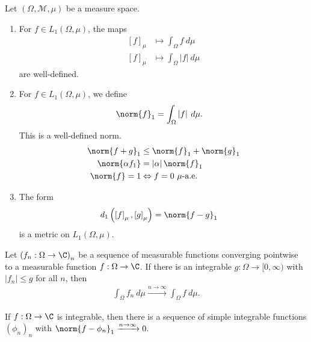 \begin{fact}
  Let $\left(\Omega,\mathcal{M},\mu\right)$ be a measure space.
  \begin{enumerate}[(1)]
    \item For $f\in L_{1}\left(\Omega,\mu\right)$, the maps
      \begin{align*}
        \left[f\right]_{\mu} &\longmapsto \int_{\Omega}^{} f\:d\mu\\
        \left[f\right]_{\mu} &\longmapsto \int_{\Omega}^{} \left\vert f \right\vert\:d\mu
      \end{align*}
      are well-defined.
    \item For $f\in L_{1}\left(\Omega,\mu\right)$, we define
      \begin{align*}
        \norm{f}_{1} &= \int_{\Omega}^{} \left\vert f \right\vert\:d\mu.
      \end{align*}
      This is a well-defined norm.
      \begin{align*}
        \norm{f+g}_{1} &\leq \norm{f}_{1} + \norm{g}_{1}\\
        \norm{\alpha f_1} &= \left\vert \alpha \right\vert\norm{f}_{1}\\
        \norm{f} = 1 &\Leftrightarrow f= 0 \text{ $\mu$-a.e.}
      \end{align*}
    \item The form
      \begin{align*}
        d_1\left(\left[f\right]_{\mu},\left[g\right]_{\mu}\right) &= \norm{f-g}_{1}
      \end{align*}
      is a metric on $L_{1}\left(\Omega,\mu\right)$.
  \end{enumerate}
\end{fact}
\begin{theorem}
  Let $\left(f_n:\Omega\rightarrow \C\right)_{n}$ be a sequence of measurable functions converging pointwise to a measurable function $f: \Omega\rightarrow \C$. If there is an integrable $g: \Omega \rightarrow [0,\infty)$ with $\left\vert f_n \right\vert\leq g$ for all $n$, then
  \begin{align*}
    \int_{\Omega}^{} f_n\:d\mu \xrightarrow{n\rightarrow\infty}\int_{\Omega}^{} f\:d\mu.
  \end{align*}
\end{theorem}
\begin{corollary}
  If $f: \Omega\rightarrow \C$ is integrable, then there is a sequence of simple integrable functions $\left(\phi_n\right)_n$ with $\norm{f - \phi_{n}}_{1}\xrightarrow{n\rightarrow\infty}0$.
\end{corollary}
